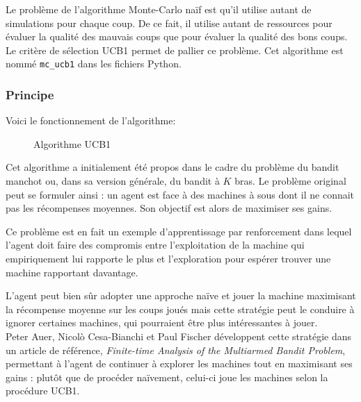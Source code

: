 \documentclass[a4paper]{article}
\theoremstyle{definition}
\begin{document}
Le problème de l'algorithme Monte-Carlo naïf est qu'il utilise autant de simulations pour chaque coup. De ce fait, il utilise autant de ressources pour évaluer la qualité des mauvais coups que pour évaluer la qualité des bons coups. Le critère de sélection UCB1 permet de pallier ce problème.
Cet algorithme est nommé \texttt{mc\_ucb1} dans les fichiers Python.

\subsubsection{Principe}

Voici le fonctionnement de l'algorithme: 

\begin{figure}[h]
	\noindent{}
	\caption{Algorithme UCB1}
\end{figure}

Cet algorithme a initialement été propos dans le cadre du problème du bandit manchot ou, dans sa version générale, du bandit à $K$ bras. Le problème original peut se formuler ainsi : un agent est face à des machines à sous dont il ne connait pas les récompenses moyennes. Son objectif est alors de maximiser ses gains.

Ce problème est en fait un exemple d'apprentissage par renforcement dans lequel l'agent doit faire des compromis entre l'exploitation de la machine qui empiriquement lui rapporte le plus et l'exploration pour espérer trouver une machine rapportant davantage.

L'agent peut bien sûr adopter une approche naïve et jouer la machine maximisant la récompense moyenne sur les coups joués mais  cette stratégie peut le conduire à ignorer certaines machines, qui pourraient être plus intéressantes à jouer. \\

Peter Auer, Nicol\`o Cesa-Bianchi et Paul Fischer développent cette stratégie dans un article de référence, \textit{Finite-time Analysis of the Multiarmed Bandit Problem}, permettant à l'agent de continuer à explorer les machines tout en maximisant ses gains : plutôt que de procéder naïvement, celui-ci joue les machines selon la procédure UCB1.\\
\end{document}
